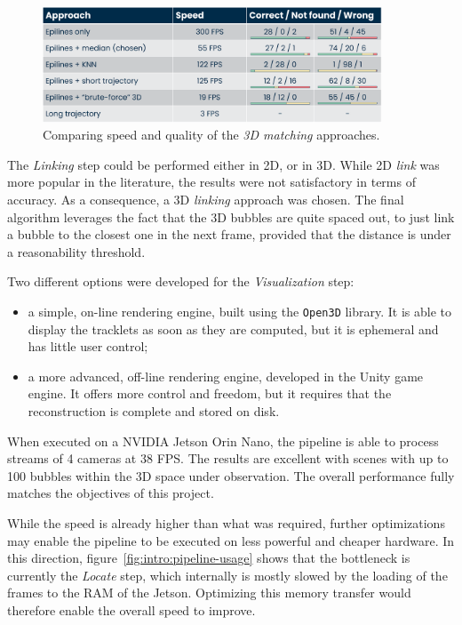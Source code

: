 \begin{figure}
	\centerline{\includegraphics[width=0.9\textwidth]{images/3d-matching-comparison.png}}
	\caption{\centering Comparing speed and quality of the \textit{3D matching} approaches.}
	\label{fig:intro:3dmatching-cmp}
\end{figure}


The \textit{Linking} step could be performed either in 2D, or in 3D.
While 2D \textit{link} was more popular in the literature, the results were not satisfactory in terms of accuracy.
As a consequence, a 3D \textit{linking} approach was chosen.
The final algorithm leverages the fact that the 3D bubbles are quite spaced out, to just link a bubble to the closest one in the next frame, provided that the distance is under a reasonability threshold.


Two different options were developed for the \textit{Visualization} step:
\begin{itemize}
	\itemsep 0em
	\item a simple, on-line rendering engine, built using the \texttt{Open3D} library. It is able to display the tracklets as soon as they are computed, but it is ephemeral and has little user control;
	\item a more advanced, off-line rendering engine, developed in the Unity game engine. It offers more control and freedom, but it requires that the reconstruction is complete and stored on disk.
\end{itemize}


When executed on a NVIDIA Jetson Orin Nano, the pipeline is able to process streams of 4 cameras at 38 FPS.
The results are excellent with scenes with up to 100 bubbles within the 3D space under observation.
The overall performance fully matches the objectives of this project.

While the speed is already higher than what was required, further optimizations may enable the pipeline to be executed on less powerful and cheaper hardware.
In this direction, figure~\ref{fig:intro:pipeline-usage} shows that the bottleneck is currently the \textit{Locate} step, which internally is mostly slowed by the loading of the frames to the RAM of the Jetson.
Optimizing this memory transfer would therefore enable the overall speed to improve.

